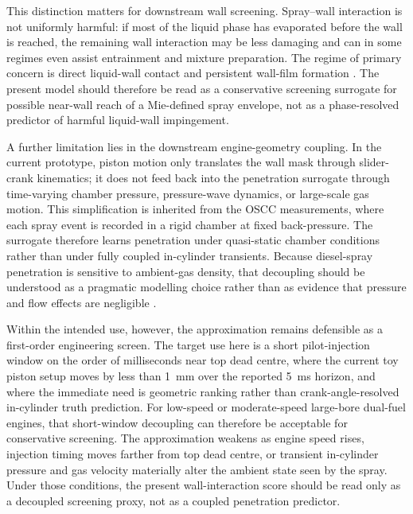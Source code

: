 \documentclass[english, 12pt, a4paper, elec, utf8, a-2b, online]{aaltothesis}
\begin{document}
This distinction matters for downstream wall screening. Spray--wall interaction is not uniformly harmful: if most of the liquid phase has evaporated before the wall is reached, the remaining wall interaction may be less damaging and can in some regimes even assist entrainment and mixture preparation. The regime of primary concern is direct liquid-wall contact and persistent wall-film formation \cite{MorieiraMotaPanao2010,liu2024marine_impingement,peraza2022swi,ahmad2025fueldilution}. The present model should therefore be read as a conservative screening surrogate for possible near-wall reach of a Mie-defined spray envelope, not as a phase-resolved predictor of harmful liquid-wall impingement.

A further limitation lies in the downstream engine-geometry coupling. In the current prototype, piston motion only translates the wall mask through slider-crank kinematics; it does not feed back into the penetration surrogate through time-varying chamber pressure, pressure-wave dynamics, or large-scale gas motion. This simplification is inherited from the OSCC measurements, where each spray event is recorded in a rigid chamber at fixed back-pressure. The surrogate therefore learns penetration under quasi-static chamber conditions rather than under fully coupled in-cylinder transients. Because diesel-spray penetration is sensitive to ambient-gas density, that decoupling should be understood as a pragmatic modelling choice rather than as evidence that pressure and flow effects are negligible \cite{NaberSiebers1996}.

Within the intended use, however, the approximation remains defensible as a first-order engineering screen. The target use here is a short pilot-injection window on the order of milliseconds near top dead centre, where the current toy piston setup moves by less than \SI{1}{mm} over the reported \SI{5}{ms} horizon, and where the immediate need is geometric ranking rather than crank-angle-resolved in-cylinder truth prediction. For low-speed or moderate-speed large-bore dual-fuel engines, that short-window decoupling can therefore be acceptable for conservative screening. The approximation weakens as engine speed rises, injection timing moves farther from top dead centre, or transient in-cylinder pressure and gas velocity materially alter the ambient state seen by the spray. Under those conditions, the present wall-interaction score should be read only as a decoupled screening proxy, not as a coupled penetration predictor.
\end{document}
